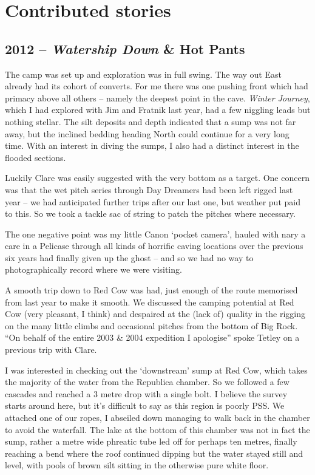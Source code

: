 

\section{Contributed stories}


\subsection{\texorpdfstring{2012 -- \emph{Watership Down} \& Hot
Pants}{2012 -- Watership Down \& Hot Pants}}

The camp was set up and exploration was in full swing. The way out East
already had its cohort of converts. For me there was one pushing front
which had primacy above all others -- namely the deepest point in the
cave. \emph{Winter Journey}, which I had explored with Jim and Fratnik
last year, had a few niggling leads but nothing stellar. The silt
deposits and depth indicated that a sump was not far away, but the
inclined bedding heading North could continue for a very long time. With
an interest in diving the sumps, I also had a distinct interest in the
flooded sections.

Luckily Clare was easily suggested with the very bottom as a target. One
concern was that the wet pitch series through Day Dreamers had been left
rigged last year -- we had anticipated further trips after our last one,
but weather put paid to this. So we took a tackle sac of string to patch
the pitches where necessary.

The one negative point was my little Canon `pocket camera', hauled with
nary a care in a Pelicase through all kinds of horrific caving locations
over the previous six years had finally given up the ghost -- and so we
had no way to photographically record where we were visiting.

A smooth trip down to Red Cow was had, just enough of the route
memorised from last year to make it smooth. We discussed the camping
potential at Red Cow (very pleasant, I think) and despaired at the (lack
of) quality in the rigging on the many little climbs and occasional
pitches from the bottom of Big Rock. ``On behalf of the entire 2003 \&
2004 expedition I apologise'' spoke Tetley on a previous trip with
Clare.

I was interested in checking out the `downstream' sump at Red Cow, which
takes the majority of the water from the Republica chamber. So we
followed a few cascades and reached a 3 metre drop with a single bolt. I
believe the survey starts around here, but it's difficult to say as this
region is poorly PSS. We attached one of our ropes, I abseiled down
managing to walk back in the chamber to avoid the waterfall. The lake at
the bottom of this chamber was not in fact the sump, rather a metre wide
phreatic tube led off for perhaps ten metres, finally reaching a bend
where the roof continued dipping but the water stayed still and level,
with pools of brown silt sitting in the otherwise pure white floor.

